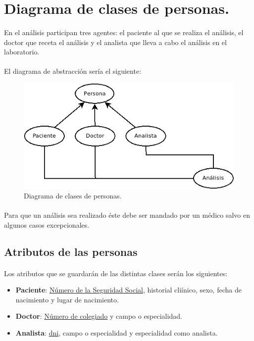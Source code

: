 \documentclass[a4paper,10pt]{article}
\begin{document}
\section{Diagrama de clases de personas.}
\paragraph{}
En el análisis participan tres agentes: el paciente al que se realiza el análisis, el doctor que receta el análisis y el analista que lleva a cabo el análisis en el laboratorio.
\paragraph{}
El diagrama de abstracción sería el siguiente:
\vspace{0.5cm}
\begin{center}
	\begin{figure}[hbt]
		\includegraphics[width=\textwidth]{img/personas.png}
		\caption{Diagrama de clases de personas.}
		\label{fig:diagramapersonas}
	\end{figure}
\end{center}
\paragraph{}
Para que un análisis sea realizado éste debe ser mandado por un médico salvo en algunos casos excepcionales.
\subsection{Atributos de las personas}

\paragraph{}
Los atributos que se guardarán de las distintas clases serán los siguientes:
\begin{itemize}
	\item {\bf Paciente}: \underline{Número de la Seguridad Social}, historial cliínico, sexo, fecha de nacimiento y lugar de nacimiento.
	\item {\bf Doctor}: \underline{Número de colegiado} y campo o especialidad.
	\item {\bf Analista}: \underline{dni}, campo o especialidad y especialidad como analista.
\end{itemize}
\pagebreak
\end{document}

